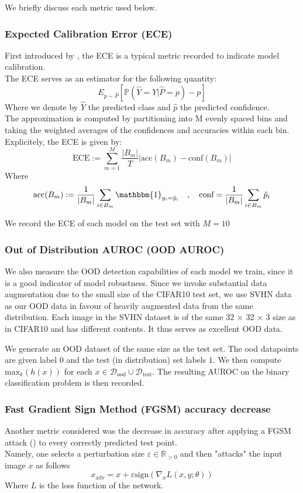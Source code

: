 \documentclass{article}
\begin{document}
We briefly discuss each metric used below.
\subsubsection*{Expected Calibration Error (ECE)} 
First introduced by \cite{guo2017calibrationmodernneuralnetworks}, the ECE is a typical metric recorded to indicate model calibration. \\
The ECE serves as an estimator for the following quantity:
\[
	E_{p\sim \hat{P}}\left[\mathbb{P}\left( \hat{Y} = Y | \hat{P} = p \right) - p \right]
\]
Where we denote by $\hat{Y}$ the predicted class and $\hat{p}$ the predicted confidence.\\
The approximation is computed by partitioning into M evenly spaced bins and taking the weighted averages of the confidences and accuracies within each bin. Explicitely, the ECE is given by:
\[
	\text{ECE} := \sum_{m=1}^{M} \frac{|B_m|}{T} \left| \text{acc}(B_m) - \text{conf}(B_m) \right|
\] 
Where
\[
\text{acc}(B_m) := \frac{1}{|B_m|} \sum_{i \in B_m} \mathbbm{1}_{y_i = \hat{y}_i} \quad , \quad 
\text{conf} = \frac{1}{|B_m|} \sum_{i \in B_m} \hat{p}_i
\]

We record the ECE of each model on the test set with $M=10$ 
\subsubsection*{Out of Distribution AUROC (OOD AUROC)} 
We also measure the OOD detection capabilities of each model we train, since it is a good indicator of model robustness. 
Since we invoke substantial data augmentation due to the small size of the CIFAR10 test set, we use SVHN data as our OOD data in favour of heavily augmented data from the same distribution. Each image in the SVHN dataset is of the same 32 $\times$ 32 $\times$ 3 size as in CIFAR10 and has different contents. It thus serves as excellent OOD data. 

We generate an OOD dataset of the same size as the test set. The ood datapoints are given label $0$ and the test (in distribution) set labels $1$. We then compute $\text{max}_k(h(x))$ for each $x\in\mathcal{D}_{\text{ood}} \cup \mathcal{D}_{\text{test}}$. The resulting AUROC on the binary classification problem is then recorded. \\
\subsubsection*{Fast Gradient Sign Method (FGSM) accuracy decrease}
Another metric considered was the decrease in accuracy after applying a FGSM attack (\cite{goodfellow2015explainingharnessingadversarialexamples}) to every correctly predicted test point. \\
Namely, one selects a perturbation size $\varepsilon \in \mathbb{R}_{>0}$ and then "attacks" the input image $x$ as follows
\[
x_{\text{adv}} = x + \varepsilon \text{sign}(\nabla_x L(x,y; \theta))
\] 
Where $L$ is the loss function of the network.
\end{document}
